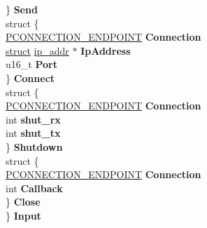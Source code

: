 \begin{DoxyCompactItemize}
\begin{tabbing}
\>\} {\bfseries Send}\\
\>struct \{\\
\>\>\hyperlink{struct___c_o_n_n_e_c_t_i_o_n___e_n_d_p_o_i_n_t}{PCONNECTION\_ENDPOINT} {\bfseries Connection}\\
\>\>\hyperlink{interfacestruct}{struct} \hyperlink{structip__addr}{ip\_addr} $\ast$ {\bfseries IpAddress}\\
\>\>u16\_t {\bfseries Port}\\
\>\} {\bfseries Connect}\\
\>struct \{\\
\>\>\hyperlink{struct___c_o_n_n_e_c_t_i_o_n___e_n_d_p_o_i_n_t}{PCONNECTION\_ENDPOINT} {\bfseries Connection}\\
\>\>int {\bfseries shut\_rx}\\
\>\>int {\bfseries shut\_tx}\\
\>\} {\bfseries Shutdown}\\
\>struct \{\\
\>\>\hyperlink{struct___c_o_n_n_e_c_t_i_o_n___e_n_d_p_o_i_n_t}{PCONNECTION\_ENDPOINT} {\bfseries Connection}\\
\>\>int {\bfseries Callback}\\
\>\} {\bfseries Close}\\
\} {\bfseries Input}\\


\end{tabbing}
\end{DoxyCompactItemize}
